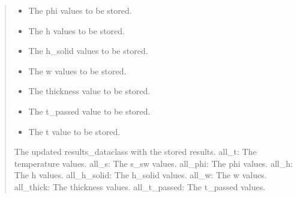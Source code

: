 \documentclass[a4paper,11pt,english,openany]{sphinxmanual}
\begin{document}
\begin{fulllineitems}
\begin{fulllineitems}
\begin{quote}
\begin{description}
\begin{itemize}
\item {} 
\sphinxAtStartPar
{} \textendash{} The phi values to be stored.

\item {} 
\sphinxAtStartPar
{} \textendash{} The h values to be stored.

\item {} 
\sphinxAtStartPar
{} \textendash{} The h\_solid values to be stored.

\item {} 
\sphinxAtStartPar
{} \textendash{} The w values to be stored.

\item {} 
\sphinxAtStartPar
{} \textendash{} The thickness value to be stored.

\item {} 
\sphinxAtStartPar
{} \textendash{} The t\_passed value to be stored.

\item {} 
\sphinxAtStartPar
{} \textendash{} The t value to be stored.

\end{itemize}

\sphinxAtStartPar
The updated results\_dataclass with the stored results.
\sphinxhyphen{} all\_t: The temperature values.
\sphinxhyphen{} all\_s: The s\_sw values.
\sphinxhyphen{} all\_phi: The phi values.
\sphinxhyphen{} all\_h: The h values.
\sphinxhyphen{} all\_h\_solid: The h\_solid values.
\sphinxhyphen{} all\_w: The w values.
\sphinxhyphen{} all\_thick: The thickness values.
\sphinxhyphen{} all\_t\_passed: The t\_passed values.

\end{description}\end{quote}

\end{fulllineitems}



\end{fulllineitems}
\end{document}
